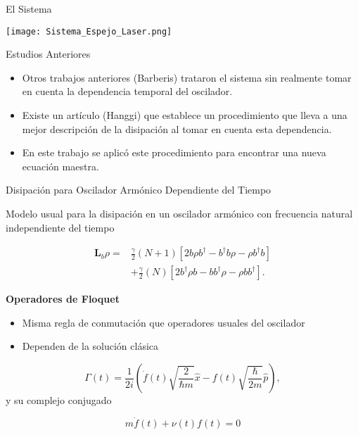 \documentclass[10pt]{beamer}
\begin{document}
\begin{frame}{El Sistema}

\texttt{[image: Sistema\_Espejo\_Laser.png]} 

\end{frame}

\begin{frame}{Estudios Anteriores}

\begin{itemize}
\item Otros trabajos anteriores (Barberis) trataron el sistema sin realmente tomar en cuenta la dependencia temporal del oscilador.

\item Existe un artículo (Hanggi) que establece un procedimiento que lleva a una mejor descripción de la disipación al tomar en cuenta esta dependencia.

\item En este trabajo se aplicó este procedimiento para encontrar una nueva ecuación maestra.

\end{itemize}

\end{frame}

\begin{frame}{Disipación para Oscilador Armónico Dependiente del Tiempo}

Modelo usual para la disipación en un oscilador armónico con frecuencia natural independiente del tiempo

\begin{align*}
\textbf{L}_b \rho =& \frac{\gamma}{2}(N + 1)[2b\rho b^\dagger -b^\dagger b\rho - \rho b^\dagger b ] \nonumber \\
 &+ \frac{\gamma}{2}(N)[2b^\dagger\rho b -bb^\dagger\rho - \rho  bb^\dagger ].
\end{align*} 

\end{frame}

\begin{frame}

\textbf{Operadores de Floquet}

\begin{itemize}
\item Misma regla de conmutación que operadores usuales del oscilador

\item Dependen de la solución clásica
\end{itemize}

\begin{equation*}
\Gamma(t) = \frac{1}{2i}(\dot{f}(t)\sqrt{\frac{2}{\hbar m}}\hat{x}-f(t)\sqrt{\frac{\hbar}{2m}}\hat{p}),
\end{equation*} y su complejo conjugado

\begin{equation*}
m\ddot{f}(t) + \nu(t)f(t)=0
\end{equation*}

\end{frame}
\end{document}
